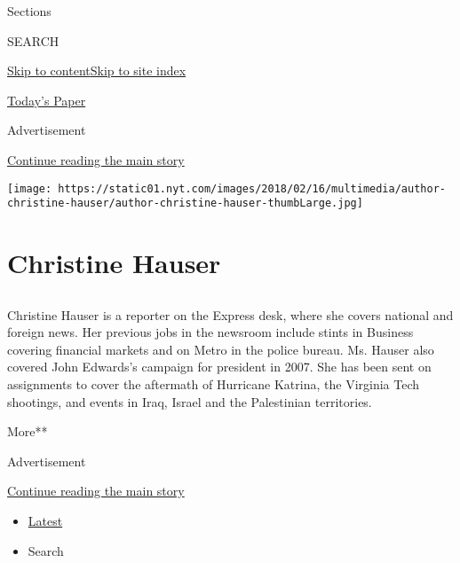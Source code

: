 Sections

SEARCH

\protect\hyperlink{site-content}{Skip to
content}\protect\hyperlink{site-index}{Skip to site index}

\href{https://myaccount.nytimes.com/auth/login?response_type=cookie\&client_id=vi}{}

\href{https://www.nytimes.com/section/todayspaper}{Today's Paper}

Advertisement

\protect\hyperlink{after-top}{Continue reading the main story}

\texttt{[image: https://static01.nyt.com/images/2018/02/16/multimedia/author-christine-hauser/author-christine-hauser-thumbLarge.jpg]}

\hypertarget{christine-hauser}{%
\section{Christine Hauser}\label{christine-hauser}}

\subsection{}

Christine Hauser is a reporter on the Express desk, where she covers
national and foreign news. Her previous jobs in the newsroom include
stints in Business covering financial markets and on Metro in the police
bureau. Ms. Hauser also covered John Edwards's campaign for president in
2007. She has been sent on assignments to cover the aftermath of
Hurricane Katrina, the Virginia Tech shootings, and events in Iraq,
Israel and the Palestinian territories.

More**

Advertisement

\protect\hyperlink{after-mid1}{Continue reading the main story}

\begin{itemize}
\tightlist
\item
  \protect\hyperlink{stream-panel}{Latest}
\item
  Search
\end{itemize}

